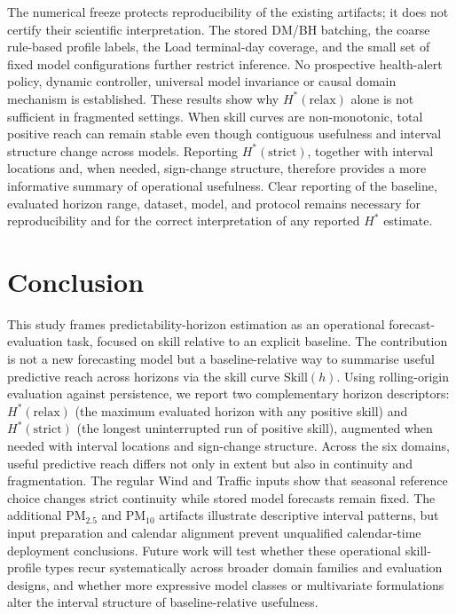 \documentclass[pdflatex,sn-mathphys]{sn-jnl}
\begin{document}
The numerical freeze protects reproducibility of the existing artifacts; it
does not certify their scientific interpretation. The stored DM/BH batching,
the coarse rule-based profile labels, the Load terminal-day coverage, and the
small set of fixed model configurations further restrict inference. No
prospective health-alert policy, dynamic controller, universal model
invariance or causal domain mechanism is established.
These results show why $H^*(\mathrm{relax})$ alone is not sufficient in
fragmented settings. When skill curves are non-monotonic, total positive
reach can remain stable even though contiguous usefulness and interval
structure change across models. Reporting $H^*(\mathrm{strict})$,
together with interval locations and, when needed, sign-change
structure, therefore provides a more informative summary of operational
usefulness. Clear reporting of the baseline, evaluated horizon range,
dataset, model, and protocol remains necessary for reproducibility and
for the correct interpretation of any reported $H^*$ estimate.

\section{Conclusion}
This study frames predictability-horizon estimation as an operational
forecast-evaluation task, focused on skill relative to an explicit
baseline. The contribution is not a new forecasting model but a
baseline-relative way to summarise useful predictive reach
across horizons via the skill curve $\mathrm{Skill}(h)$.
Using rolling-origin evaluation against persistence, we report two
complementary horizon descriptors: $H^*(\mathrm{relax})$ (the maximum
evaluated horizon with any positive skill) and $H^*(\mathrm{strict})$
(the longest uninterrupted run of positive skill), augmented when needed
with interval locations and sign-change structure. Across the six
domains, useful predictive reach differs not only in extent but also in
continuity and fragmentation. The regular Wind and Traffic inputs show
that seasonal reference choice changes strict continuity while stored model
forecasts remain fixed. The additional PM$_{2.5}$ and PM$_{10}$ artifacts
illustrate descriptive interval patterns, but input preparation and calendar
alignment prevent unqualified calendar-time deployment conclusions. Future
work will test whether these
operational skill-profile types recur systematically across broader
domain families and evaluation designs, and whether more expressive model
classes or multivariate formulations alter the interval structure of
baseline-relative usefulness.
\end{document}
